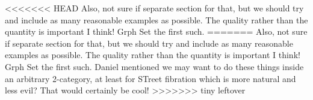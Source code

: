 \documentclass{amsart}
\begin{document}
<<<<<<< HEAD
{\chris Also, not sure if separate section for
  that, but we should try and include as many
  reasonable examples as possible. The quality
  rather than the quantity is important I think!
  Grph Set the first such.}
=======
{\chris Also, not sure if separate section for that, but we should try and include as many reasonable examples as possible. The quality rather
than the quantity is important I think! Grph Set the first such.}
{\chris Daniel mentioned we may want to do these things inside an arbitrary 2-category, at least for STreet fibration which is more natural and less evil? That would certainly be cool!}
>>>>>>> tiny leftover



\end{document}
